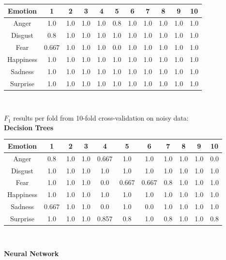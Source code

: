 \documentclass[a4paper]{article}
\begin{document}
\begin{center}
  \begin{tabular}{|c|cccccccccc|}
  \hline
    Emotion & 1 & 2 & 3 & 4 & 5 & 6 & 7 & 8 & 9 & 10 \\
    \hline
    Anger 	& 1.0 & 1.0 & 1.0 & 1.0 & 0.8 & 1.0 & 1.0 & 1.0 & 1.0 & 1.0 \\
	Disgust & 0.8 & 1.0 & 1.0 & 1.0 & 1.0 & 1.0 & 1.0 & 1.0 & 1.0 & 1.0 \\
	Fear 	& 0.667 & 1.0 & 1.0 & 1.0 & 0.0 & 1.0 & 1.0 & 1.0 & 1.0 & 1.0 \\
	Happiness 	& 1.0 & 1.0 & 1.0 & 1.0 & 1.0 & 1.0 & 1.0 & 1.0 & 1.0 & 1.0 \\
	Sadness 	& 1.0 & 1.0 & 1.0 & 1.0 & 1.0 & 1.0 & 1.0 & 1.0 & 1.0 & 1.0 \\
	Surprise 	& 1.0 & 1.0 & 1.0 & 1.0 & 1.0 & 1.0 & 1.0 & 1.0 & 1.0 & 1.0 \\
	\hline
  \end{tabular}\\
  \end{center}

$F_1$ results per fold from 10-fold cross-validation on noisy data:\\
  
{\bf Decision Trees}\\

\begin{center}
  \begin{tabular}{|c|cccccccccc|}
  \hline
    Emotion & 1 & 2 & 3 & 4 & 5 & 6 & 7 & 8 & 9 & 10 \\
    \hline
    Anger & 0.8 & 1.0 & 1.0 & 0.667 & 1.0 & 1.0 & 1.0 & 1.0 & 1.0 &0.0\\
Disgust   & 1.0 & 1.0 & 1.0 & 1.0 & 1.0 & 1.0 & 1.0 & 1.0 & 1.0 & 1.0 \\
Fear & 1.0 & 1.0 & 1.0 &0.0& 0.667 & 0.667 & 0.8 & 1.0 & 1.0 & 1.0 \\
Happiness & 1.0 & 1.0 & 1.0 & 1.0 & 1.0 & 1.0 & 1.0 & 1.0 & 1.0 & 1.0 \\
Sadness & 0.667 & 1.0 & 1.0 &0.0& 1.0 &0.0& 1.0 & 1.0 & 1.0 & 1.0 \\
Surprise & 1.0 & 1.0 & 1.0 & 0.857 & 0.8 & 1.0 & 0.8 & 1.0 & 1.0 & 0.8 \\
	\hline
  \end{tabular}\\
  \end{center} 
  
 {\bf Neural Network}\\
\end{document}
